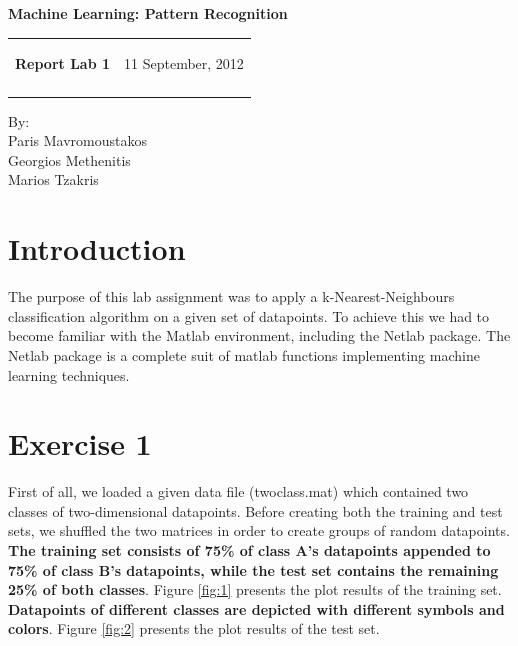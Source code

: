 \documentclass[letterpaper,11pt]{article}
\newcommand{\resheading}[1]{{\large \colorbox{mygrey}{\begin{minipage}{\textwidth}{\textbf{#1 \vphantom{p\^{E}}}}\end{minipage}}}}
\begin{document}
\begin{center}
{\LARGE \textbf{Machine Learning: Pattern Recognition}}\\ [1em]
\end{center}
\newcommand{\mywebheader}{
    \begin{tabular}{@{}p{5in}p{4in}}
		{\resheading{Report Lab 1}} & {\Large 11 September, 2012}\\\vspace{0.2cm}
	    \end{tabular}}
    \mywebheader
    
    	\begin{center}
    	{\Large By:} \\ \vspace{0.1cm}
	    {\Large Paris Mavromoustakos} \\  \vspace{0.1cm}
	    {\Large Georgios Methenitis} \\ \vspace{0.1cm}
	    {\Large Marios Tzakris}
	    \end{center}

  
  \section*{Introduction}
  The purpose of this lab assignment was to apply a k-Nearest-Neighbours classification algorithm on a given set of datapoints. To achieve this we had to become familiar with the Matlab environment, including the Netlab package. The Netlab package is a complete suit of matlab functions implementing machine learning techniques.
 
 \section*{Exercise 1}
 First of all, we loaded a given data file (twoclass.mat) which contained two classes of two-dimensional datapoints. Before creating both the training and test sets, we shuffled the two matrices in order to create groups of random datapoints. \textbf{The training set consists of 75\% of class A's datapoints appended to 75\% of class B's datapoints, while the test set contains the remaining 25\% of both classes}. Figure \ref{fig:1} presents the plot results of the training set. \textbf{Datapoints of different classes are depicted with different symbols and colors}. Figure \ref{fig:2} presents the plot results of the test set.
 
\end{document}
